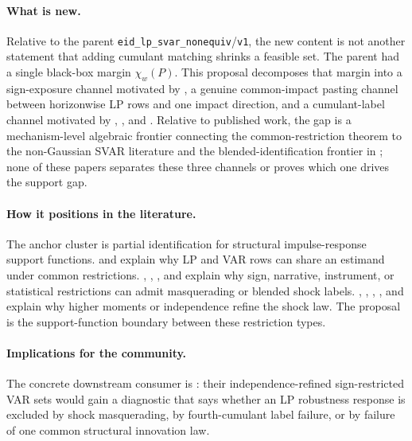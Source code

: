 \documentclass[11pt]{article}
\theoremstyle{definition}
\theoremstyle{plain}
\theoremstyle{remark}
\begin{document}
\paragraph{What is new.}
Relative to the parent \texttt{eid\_lp\_svar\_nonequiv}/\texttt{v1}, the new content is not another statement that adding cumulant matching shrinks a feasible set.  The parent had a single black-box margin \(\chi_w(P)\).  This proposal decomposes that margin into a sign-exposure channel motivated by \citet[Section~2]{Wolf2022}, a genuine common-impact pasting channel between horizonwise LP rows and one impact direction, and a cumulant-label channel motivated by \citet[Sections~2--3]{GourierouxMonfortRenne2017}, \citet[Sections~2--3]{LanneMeitzSaikkonen2017}, and \citet[Sections~2--3]{Guay2021}.  Relative to published work, the gap is a mechanism-level algebraic frontier connecting the \citet[Sections~2--3]{PlagborgMollerWolf2021} common-restriction theorem to the non-Gaussian SVAR literature and the blended-identification frontier in \citet[Sections~2--3]{CarrieroMarcellinoTornese2024}; none of these papers separates these three channels or proves which one drives the support gap.

\paragraph{How it positions in the literature.}
The anchor cluster is partial identification for structural impulse-response support functions.  \citet{PlagborgMollerWolf2021} and \citet{MontielOleaPlagborgMollerQianWolf2024} explain why LP and VAR rows can share an estimand under common restrictions.  \citet{AriasRubioRamirezWaggoner2018}, \citet{Read2022}, \citet{Wolf2022}, and \citet{CarrieroMarcellinoTornese2024} explain why sign, narrative, instrument, or statistical restrictions can admit masquerading or blended shock labels.  \citet{GourierouxMonfortRenne2017}, \citet{LanneMeitzSaikkonen2017}, \citet{Guay2021}, \citet{DrautzburgWright2023}, and \citet{LanneLiuLuoto2026} explain why higher moments or independence refine the shock law.  The proposal is the support-function boundary between these restriction types.

\paragraph{Implications for the community.}
The concrete downstream consumer is \citet{DrautzburgWright2023}: their independence-refined sign-restricted VAR sets would gain a diagnostic that says whether an LP robustness response is excluded by shock masquerading, by fourth-cumulant label failure, or by failure of one common structural innovation law.
\end{document}
